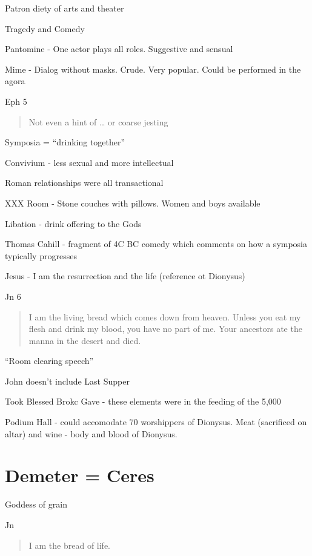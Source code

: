 \documentclass[
]{book}
\begin{document}
Patron diety of arts and theater

Tragedy and Comedy

Pantomine - One actor plays all roles. Suggestive and sensual

Mime - Dialog without masks. Crude. Very popular. Could be performed in the agora

Eph 5

\begin{quote}
Not even a hint of \ldots{} or coarse jesting
\end{quote}

Symposia = ``drinking together''

Convivium - less sexual and more intellectual

Roman relationships were all transactional

XXX Room - Stone couches with pillows. Women and boys available

Libation - drink offering to the Gods

Thomas Cahill - fragment of 4C BC comedy which comments on how a symposia typically progresses

Jesus - I am the resurrection and the life (reference ot Dionysus)

Jn 6

\begin{quote}
I am the living bread which comes down from heaven. Unless you eat my flesh and drink my blood, you have no part of me. Your ancestors ate the manna in the desert and died.
\end{quote}

``Room clearing speech''

John doesn't include Last Supper

Took \textbar{} Blessed \textbar{} Brokc \textbar{} Gave - these elements were in the feeding of the 5,000

Podium Hall - could accomodate 70 worshippers of Dionysus. Meat (sacrificed on altar) and wine - body and blood of Dionysus.

\hypertarget{demeter-ceres}{%
\section{Demeter = Ceres}\label{demeter-ceres}}

Goddess of grain

Jn

\begin{quote}
I am the bread of life.
\end{quote}
\end{document}
